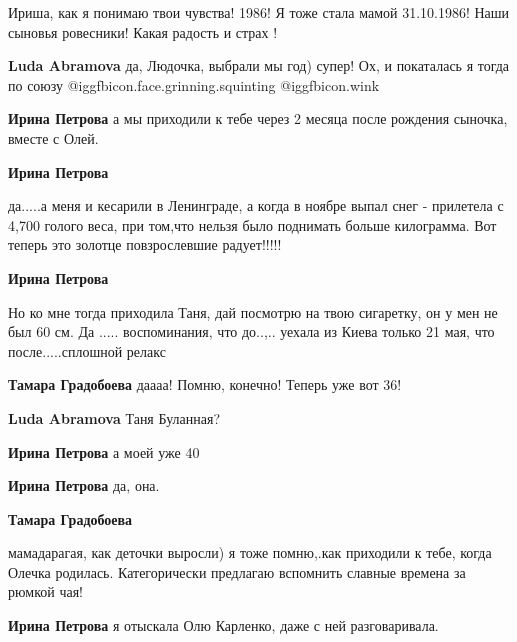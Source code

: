  
 
 
 
 

Ириша, как я понимаю твои чувства! 1986! Я тоже стала мамой 31.10.1986! Наши сыновья ровесники! Какая радость и страх !

\textbf{Luda Abramova} да, Людочка, выбрали мы год) супер! Ох, и покаталась я тогда по союзу @igg{fbicon.face.grinning.squinting}  @igg{fbicon.wink} 

\textbf{Ирина Петрова} а мы приходили к тебе через 2 месяца после рождения сыночка, вместе с Олей.

\textbf{Ирина Петрова} 

да.....а меня и кесарили в Ленинграде, а когда в ноябре выпал снег - прилетела с
4,700 голого веса, при том,что нельзя было поднимать больше килограмма. Вот
теперь это золотце повзрослевшие радует!!!!!


\textbf{Ирина Петрова} 

Но ко мне тогда приходила Таня, дай посмотрю на твою сигаретку, он у мен не был
60 см. Да ..... воспоминания, что до..,.. уехала из Киева только 21 мая, что
после.....сплошной релакс

\textbf{Тамара Градобоева} даааа! Помню, конечно! Теперь уже вот 36!

\textbf{Luda Abramova} Таня Буланная?

\textbf{Ирина Петрова} а моей уже 40

\textbf{Ирина Петрова} да, она.

\textbf{Тамара Градобоева} 

мамадарагая, как деточки выросли) я тоже помню,.как приходили к тебе, когда
Олечка родилась. Категорически предлагаю вспомнить славные времена за рюмкой
чая!


\textbf{Ирина Петрова} я отыскала Олю Карленко, даже с ней разговаривала.
